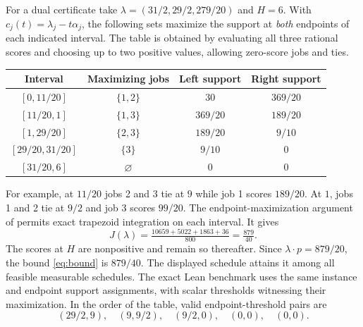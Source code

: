 For a dual certificate take $\lambda=(31/2,29/2,279/20)$ and $H=6$. With $c_j(t)=\lambda_j-t\alpha_j$, the following sets maximize the support at \emph{both} endpoints of each indicated interval. The table is obtained by evaluating all three rational scores and choosing up to two positive values, allowing zero-score jobs and ties.
\begin{center}
\begin{tabular}{@{}ccc c@{}}
\toprule
Interval & Maximizing jobs & Left support & Right support\\
\midrule
$[0,11/20]$      & $\{1,2\}$ & $30$      & $369/20$\\
$[11/20,1]$      & $\{1,3\}$ & $369/20$ & $189/20$\\
$[1,29/20]$      & $\{2,3\}$ & $189/20$ & $9/10$\\
$[29/20,31/20]$  & $\{3\}$   & $9/10$   & $0$\\
$[31/20,6]$      & $\varnothing$ & $0$  & $0$\\
\bottomrule
\end{tabular}
\end{center}
For example, at $11/20$ jobs 2 and 3 tie at $9$ while job 1 scores $189/20$. At $1$, jobs 1 and 2 tie at $9/2$ and job 3 scores $99/20$. The endpoint-maximization argument of  permits exact trapezoid integration on each interval. It gives
\[
 J(\lambda)=\tfrac{10659+5022+1863+36}{800}
            =\tfrac{879}{40}.
\]
The scores at $H$ are nonpositive and remain so thereafter. Since $\lambda\cdot p=879/20$, the bound \eqref{eq:bound} is $879/40$. The displayed schedule attains it among all feasible measurable schedules. The exact Lean benchmark uses the same instance and endpoint support assignments, with scalar thresholds witnessing their maximization.
 In the order of the table, valid endpoint-threshold pairs are
\[
 (29/2,9),\quad (9,9/2),\quad (9/2,0),\quad (0,0),\quad (0,0).
\]
